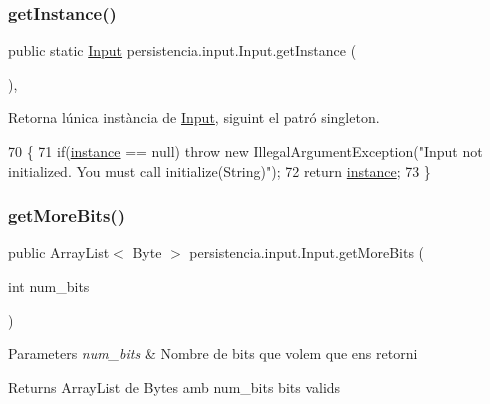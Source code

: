 \subsubsection{\texorpdfstring{get\+Instance()}{getInstance()}}
{\footnotesize\ttfamily public static \hyperlink{classpersistencia_1_1input_1_1Input}{Input} persistencia.\+input.\+Input.\+get\+Instance (\begin{DoxyParamCaption}{ }\end{DoxyParamCaption})\hspace{0.3cm}{\ttfamily [inline]}, {\ttfamily [static]}}



Retorna l\textquotesingle{}única instància de \hyperlink{classpersistencia_1_1input_1_1Input}{Input}, siguint el patró singleton. 


\begin{DoxyCode}
70                                       \{
71         \textcolor{keywordflow}{if}(\hyperlink{classpersistencia_1_1input_1_1Input_a2e516b1cbef9b704c10fd932b3d11afd}{instance} == null) \textcolor{keywordflow}{throw} \textcolor{keyword}{new} IllegalArgumentException(\textcolor{stringliteral}{"Input not initialized. You must
       call initialize(String)"});
72         \textcolor{keywordflow}{return} \hyperlink{classpersistencia_1_1input_1_1Input_a2e516b1cbef9b704c10fd932b3d11afd}{instance};
73     \}
\end{DoxyCode}
\mbox{\label{classpersistencia_1_1input_1_1Input_a81e96a5ac3ca41b5001ffff9f9acc76a}} 
\subsubsection{\texorpdfstring{get\+More\+Bits()}{getMoreBits()}}
{\footnotesize\ttfamily public Array\+List$<$ Byte $>$ persistencia.\+input.\+Input.\+get\+More\+Bits (\begin{DoxyParamCaption}\item[{int}]{num\+\_\+bits }\end{DoxyParamCaption})\hspace{0.3cm}{\ttfamily [inline]}}


\begin{DoxyParams}{Parameters}
{\em num\+\_\+bits} & Nombre de bits que volem que ens retorni \\
\hline
\end{DoxyParams}
\begin{DoxyReturn}{Returns}
Array\+List de Bytes amb num\+\_\+bits bits valids 
\end{DoxyReturn}

